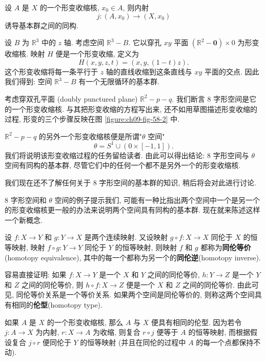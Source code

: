 \begin{theorem}
\label{theorem:ch09-sec58-58-3}
设 $A$ 是 $X$ 的一个形变收缩核, $x_0\in A$, 则内射
\[
j\colon(A,x_{0})\longrightarrow(X,x_{0})
\]
诱导基本群之间的同构.
\end{theorem}

\begin{example}
\label{example:ch09-sec58-1}
设 $B$ 为 $\mathbb{R}^{3}$ 中的 $z$ 轴. 考虑空间 $\mathbb{R}^{3}-B$. 它以穿孔 $xy$ 平面 $(\mathbb{R}^{2}-\boldsymbol{0})\times 0$ 为形变收缩核. 映射 $H$ 便是一个形变收缩, 定义为
\[
H(x,y,z,t)=(x,y,(1-t)z).
\]
这个形变收缩将每一条平行于 $z$ 轴的直线收缩到这条直线与 $xy$ 平面的交点. 因此我们得到: 空间 $\mathbb{R}^{3}-B$ 有一个无限循环的基本群.
\end{example}

\begin{example}
\label{example:ch09-sec58-2}
考虑穿双孔平面 (doubly punctured plane) $\mathbb{R}^{2}-p-q$. 我们断言 8 字形空间是它的一个形变收缩核. 与其把形变收缩的方程写出来, 还不如用草图描述形变收缩的过程, 形变的三个步骤反映在图 \cref{figure:ch09-fig-58-2} 中.
\end{example}


\begin{example}
\label{example:ch09-sec58-3}
$\mathbb{R}^{2}-p-q$ 的另外一个形变收缩核便是所谓"$\theta$ 空间"
\[
\theta=S^{1}\cup(0\times[-1,1]).
\]
我们将说明该形变收缩过程的任务留给读者. 由此可以得出结论: 8 字形空间与 $\theta$ 空间有同构的基本群, 尽管它们中的任何一个都不是另外一个的形变收缩核.

我们现在还不了解任何关于 8 字形空间的基本群的知识, 稍后将会对此进行讨论.
\end{example}

8 字形空间和 $\theta$ 空间的例子提示我们, 可能有一种比指出两个空间中一个是另一个的形变收缩核更一般的办法来说明两个空间具有同构的基本群. 现在就来陈述这样一个新概念.

\begin{definition}[伦型与同伦等价]
\label{definition:ch09-sec58-homotopy-type}
设 $f\colon X\to Y$ 和 $g\colon Y\to X$ 是两个连续映射. 又设映射 $g\circ f\colon X\to X$ 同伦于 $X$ 的恒等映射, 映射 $f\circ g\colon Y\to Y$ 同伦于 $Y$ 的恒等映射, 则映射 $f$ 和 $g$ 都称为\textbf{同伦等价}(homotopy equivalence), 其中的每一个都称为另一个的\textbf{同伦逆}(homotopy inverse).

容易直接证明: 如果 $f\colon X\to Y$ 是一个 $X$ 和 $Y$ 之间的同伦等价, $h\colon Y\to Z$ 是一个 $Y$ 和 $Z$ 之间的同伦等价, 则 $h\circ f\colon X\to Z$ 便是一个 $X$ 和 $Z$ 之间的同伦等价. 由此可见, 同伦等价关系是一个等价关系. 如果两个空间是同伦等价的, 则称这两个空间具有相同的\textbf{伦型}(homotopy type).

如果 $A$ 是 $X$ 的一个形变收缩核, 那么 $A$ 与 $X$ 便具有相同的伦型. 因为若令 $j\colon A\to X$ 为内射, $r\colon X\to A$ 为收缩, 则复合 $r\circ j$ 便等于 $A$ 的恒等映射, 而根据假设复合 $j\circ r$ 便同伦于 $Y$ 的恒等映射 (并且在同伦的过程中 $A$ 的每一个点都保持不动).
\end{definition}

